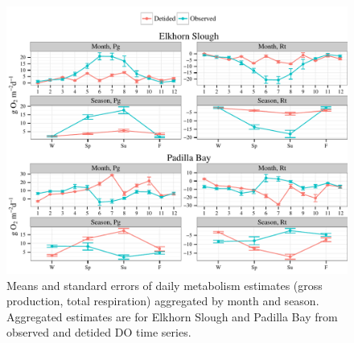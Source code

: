 \documentclass[letterpaper,12pt,oneside]{article}\usepackage[]{graphicx}\usepackage[]{color}
\makeatletter
\def\maxwidth{ %
  \ifdim\Gin@nat@width>\linewidth
    \linewidth
  \else
    \Gin@nat@width
  \fi
}
\newenvironment{knitrout}{}{} %
\makeatother
\begin{document}
\centering\vspace*{\fill}
\begin{knitrout}
\color{fgcolor}\begin{figure}[!ht]


{\centering \includegraphics[width=\maxwidth]{figure/metab_sum1} 

}

\caption[Means and standard errors of daily metabolism estimates (gross production, total respiration) aggregated by month and season]{Means and standard errors of daily metabolism estimates (gross production, total respiration) aggregated by month and season.  Aggregated estimates are for Elkhorn Slough and Padilla Bay from observed and detided \ac{DO} time series.\label{fig:metab_sum1}}
\end{figure}


\end{knitrout}
\vfill
\clearpage
\end{document}
